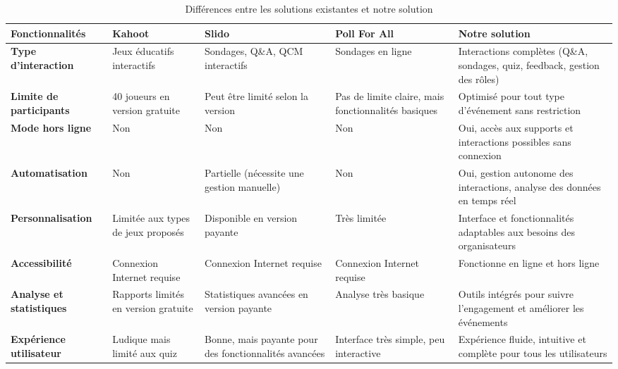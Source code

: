 \begin{table}[h]
    \centering
    \renewcommand{\arraystretch}{1.3}
    \begin{tabular}{|m{4cm}|m{3cm}|m{3cm}|m{3cm}|m{3cm}|}
        \hline
        \textbf{Fonctionnalités} & \textbf{Kahoot} & \textbf{Slido} & \textbf{Poll For All} & \textbf{Notre solution} \\
        \hline
        \textbf{Type d’interaction} & Jeux éducatifs interactifs & Sondages, Q\&A, QCM interactifs & Sondages en ligne & Interactions complètes (Q\&A, sondages, quiz, feedback, gestion des rôles) \\
        \hline
        \textbf{Limite de participants} & 40 joueurs en version gratuite & Peut être limité selon la version & Pas de limite claire, mais fonctionnalités basiques & Optimisé pour tout type d’événement sans restriction \\
        \hline
        \textbf{Mode hors ligne} & Non & Non & Non & Oui, accès aux supports et interactions possibles sans connexion \\
        \hline
        \textbf{Automatisation} & Non & Partielle (nécessite une gestion manuelle) & Non & Oui, gestion autonome des interactions, analyse des données en temps réel \\
        \hline
        \textbf{Personnalisation} & Limitée aux types de jeux proposés & Disponible en version payante & Très limitée & Interface et fonctionnalités adaptables aux besoins des organisateurs \\
        \hline
        \textbf{Accessibilité} & Connexion Internet requise & Connexion Internet requise & Connexion Internet requise & Fonctionne en ligne et hors ligne \\
        \hline
        \textbf{Analyse et statistiques} & Rapports limités en version gratuite & Statistiques avancées en version payante & Analyse très basique & Outils intégrés pour suivre l’engagement et améliorer les événements \\
        \hline
        \textbf{Expérience utilisateur} & Ludique mais limité aux quiz & Bonne, mais payante pour des fonctionnalités avancées & Interface très simple, peu interactive & Expérience fluide, intuitive et complète pour tous les utilisateurs \\
        \hline
    \end{tabular}
    \caption{Différences entre les solutions existantes et notre solution}
    \label{tab:comparaison}
\end{table}






